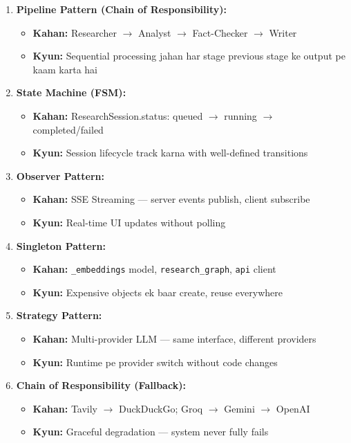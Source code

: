 \documentclass[11pt,a4paper,twoside]{report}
\begin{document}
\begin{enumerate}[label=\textbf{\arabic*.}]

\item \textbf{Pipeline Pattern (Chain of Responsibility):}
\begin{itemize}
    \item \textbf{Kahan:} Researcher $\rightarrow$ Analyst $\rightarrow$ Fact-Checker $\rightarrow$ Writer
    \item \textbf{Kyun:} Sequential processing jahan har stage previous stage ke output pe kaam karta hai
\end{itemize}

\item \textbf{State Machine (FSM):}
\begin{itemize}
    \item \textbf{Kahan:} ResearchSession.status: queued $\rightarrow$ running $\rightarrow$ completed/failed
    \item \textbf{Kyun:} Session lifecycle track karna with well-defined transitions
\end{itemize}

\item \textbf{Observer Pattern:}
\begin{itemize}
    \item \textbf{Kahan:} SSE Streaming --- server events publish, client subscribe
    \item \textbf{Kyun:} Real-time UI updates without polling
\end{itemize}

\item \textbf{Singleton Pattern:}
\begin{itemize}
    \item \textbf{Kahan:} \texttt{\_embeddings} model, \texttt{research\_graph}, \texttt{api} client
    \item \textbf{Kyun:} Expensive objects ek baar create, reuse everywhere
\end{itemize}

\item \textbf{Strategy Pattern:}
\begin{itemize}
    \item \textbf{Kahan:} Multi-provider LLM --- same interface, different providers
    \item \textbf{Kyun:} Runtime pe provider switch without code changes
\end{itemize}

\item \textbf{Chain of Responsibility (Fallback):}
\begin{itemize}
    \item \textbf{Kahan:} Tavily $\rightarrow$ DuckDuckGo; Groq $\rightarrow$ Gemini $\rightarrow$ OpenAI
    \item \textbf{Kyun:} Graceful degradation --- system never fully fails
\end{itemize}


\end{enumerate}
\end{document}
